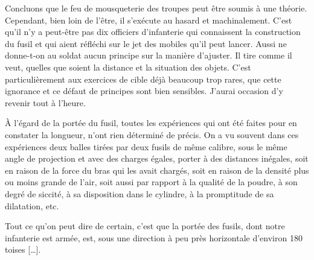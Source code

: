 \documentclass[french,twoside]{book} %
\begin{document}
Concluons que le feu de mousqueterie des troupes peut être soumis à une théorie. Cependant, bien loin de l’être, il s’exécute au hasard et machinalement. C’est qu’il n’y a peut-être pas dix officiers d’infanterie qui connaissent la construction du fusil et qui aient réfléchi sur le jet des mobiles qu’il peut lancer. Aussi ne donne-t-on au soldat aucun principe sur la manière d’ajuster. Il tire comme il veut, quelles que soient la distance et la situation des objets. C’est particulièrement aux exercices de cible déjà beaucoup trop rares, que cette ignorance et ce défaut de principes sont bien sensibles. J’aurai occasion d’y revenir tout à l’heure.\par
À l’égard de la portée du fusil, toutes les expériences qui ont été faites pour en constater la longueur, n’ont rien déterminé de précis. On a vu souvent dans ces expériences deux balles tirées par deux fusils de même calibre, sous le même angle de projection et avec des charges égales, porter à des distances inégales, soit en raison de la force du bras qui les avait chargés, soit en raison de la densité plus ou moins grande de l’air, soit aussi par rapport à la qualité de la poudre, à son degré de siccité, à sa disposition dans le cylindre, à la promptitude de sa dilatation, etc.\par
Tout ce qu’on peut dire de certain, c’est que la portée des fusils, dont notre infanterie est armée, est, sous une direction à peu près horizontale d’environ 180 toises […].\par
\end{document}

